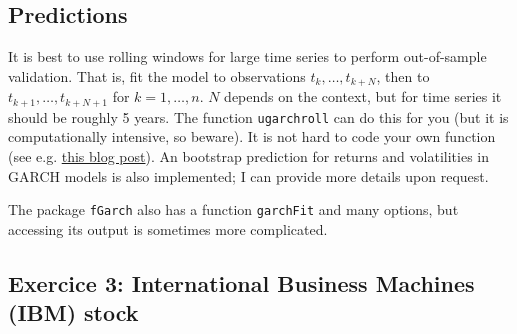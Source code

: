 \documentclass[]{book}
\newenvironment{Shaded}{\begin{snugshade}}{\end{snugshade}}
\newcommand{\KeywordTok}[1]{\textcolor[rgb]{0.13,0.29,0.53}{\textbf{#1}}}
\newcommand{\DataTypeTok}[1]{\textcolor[rgb]{0.13,0.29,0.53}{#1}}
\newcommand{\DecValTok}[1]{\textcolor[rgb]{0.00,0.00,0.81}{#1}}
\newcommand{\StringTok}[1]{\textcolor[rgb]{0.31,0.60,0.02}{#1}}
\newcommand{\CommentTok}[1]{\textcolor[rgb]{0.56,0.35,0.01}{\textit{#1}}}
\newcommand{\OtherTok}[1]{\textcolor[rgb]{0.56,0.35,0.01}{#1}}
\newcommand{\OperatorTok}[1]{\textcolor[rgb]{0.81,0.36,0.00}{\textbf{#1}}}
\newcommand{\NormalTok}[1]{#1}
\begin{document}
\subsection{Predictions}\label{predictions}

It is best to use rolling windows for large time series to perform
out-of-sample validation. That is, fit the model to observations
\(t_k, \ldots, t_{k+N}\), then to \(t_{k+1}, \ldots, t_{k+N+1}\) for
\(k=1, \ldots, n\). \(N\) depends on the context, but for time series it
should be roughly 5 years. The function \texttt{ugarchroll} can do this
for you (but it is computationally intensive, so beware). It is not hard
to code your own function (see e.g.
\href{http://unstarched.net/2012/12/26/rolling-garch-forecasts/}{this
blog post}). An bootstrap prediction for returns and volatilities in
GARCH models is also implemented; I can provide more details upon
request.

The package \texttt{fGarch} also has a function \texttt{garchFit} and
many options, but accessing its output is sometimes more complicated.

\begin{Shaded}
\end{Shaded}

\subsection{Exercice 3: International Business Machines (IBM)
stock}\label{exercice-3-international-business-machines-ibm-stock}
\end{document}

